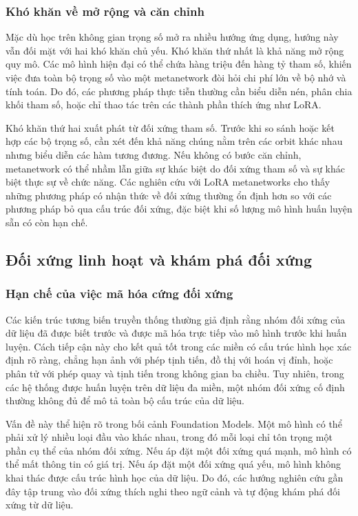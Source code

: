 \subsubsection{Khó khăn về mở rộng và căn chỉnh}

Mặc dù học trên không gian trọng số mở ra nhiều hướng ứng dụng, hướng này vẫn đối mặt với hai khó khăn chủ yếu. Khó khăn thứ nhất là khả năng mở rộng quy mô. Các mô hình hiện đại có thể chứa hàng triệu đến hàng tỷ tham số, khiến việc đưa toàn bộ trọng số vào một metanetwork đòi hỏi chi phí lớn về bộ nhớ và tính toán. Do đó, các phương pháp thực tiễn thường cần biểu diễn nén, phân chia khối tham số, hoặc chỉ thao tác trên các thành phần thích ứng như LoRA.

Khó khăn thứ hai xuất phát từ đối xứng tham số. Trước khi so sánh hoặc kết hợp các bộ trọng số, cần xét đến khả năng chúng nằm trên các orbit khác nhau nhưng biểu diễn các hàm tương đương. Nếu không có bước căn chỉnh, metanetwork có thể nhầm lẫn giữa sự khác biệt do đối xứng tham số và sự khác biệt thực sự về chức năng. Các nghiên cứu với LoRA metanetworks cho thấy những phương pháp có nhận thức về đối xứng thường ổn định hơn so với các phương pháp bỏ qua cấu trúc đối xứng, đặc biệt khi số lượng mô hình huấn luyện sẵn có còn hạn chế.


\subsection{Đối xứng linh hoạt và khám phá đối xứng}
\label{subsec:flexible-symmetries}

\subsubsection{Hạn chế của việc mã hóa cứng đối xứng}

Các kiến trúc tương biến truyền thống thường giả định rằng nhóm đối xứng của dữ liệu đã được biết trước và được mã hóa trực tiếp vào mô hình trước khi huấn luyện. Cách tiếp cận này cho kết quả tốt trong các miền có cấu trúc hình học xác định rõ ràng, chẳng hạn ảnh với phép tịnh tiến, đồ thị với hoán vị đỉnh, hoặc phân tử với phép quay và tịnh tiến trong không gian ba chiều. Tuy nhiên, trong các hệ thống được huấn luyện trên dữ liệu đa miền, một nhóm đối xứng cố định thường không đủ để mô tả toàn bộ cấu trúc của dữ liệu.

Vấn đề này thể hiện rõ trong bối cảnh Foundation Models. Một mô hình có thể phải xử lý nhiều loại đầu vào khác nhau, trong đó mỗi loại chỉ tôn trọng một phần cụ thể của nhóm đối xứng. Nếu áp đặt một đối xứng quá mạnh, mô hình có thể mất thông tin có giá trị. Nếu áp đặt một đối xứng quá yếu, mô hình không khai thác được cấu trúc hình học của dữ liệu. Do đó, các hướng nghiên cứu gần đây tập trung vào đối xứng thích nghi theo ngữ cảnh và tự động khám phá đối xứng từ dữ liệu.

